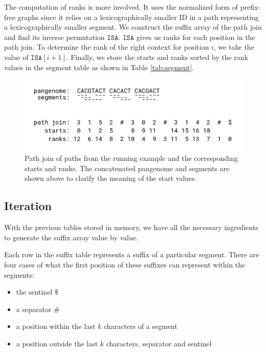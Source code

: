 The computation of ranks is more involved.
It uses the normalized form of prefix-free graphs since it relies on a lexicographically smaller ID in a path representing a lexicographically smaller segment.
We construct the suffix array of the path join and find its inverse permutation $\texttt{ISA}$.
$\texttt{ISA}$ gives us ranks for each position in the path join.
To determine the rank of the right context for position $i$, we take
the value of $\texttt{ISA}[i+1]$.
Finally, we store the starts and ranks sorted by the rank values in the segment table as shown in Table \ref{tab:segment}.

\begin{figure}
    \centering
    \includegraphics[width=\linewidth]{images/path_join.png} %
    \caption{
    Path join of paths from the running example and the corresponding starts and ranks. The concatenated pangenome and segments are shown above to clarify the meaning of the start values. \label{fig:path_join}
    }
\end{figure}

\subsection{Iteration}
With the previous tables stored in memory, we have all the necessary ingredients to generate the suffix array value by value.

Each row in the suffix table represents a suffix of a particular segment.
There are four cases of what the first position of these suffixes can represent within the segments:
\begin{itemize}
    \item the sentinel $\texttt{\$}$
    \item a separator $\texttt{\#}$
    \item a position within the last $k$ characters of a segment
    \item a position outside the last $k$ characters, separator and sentinel
\end{itemize}

